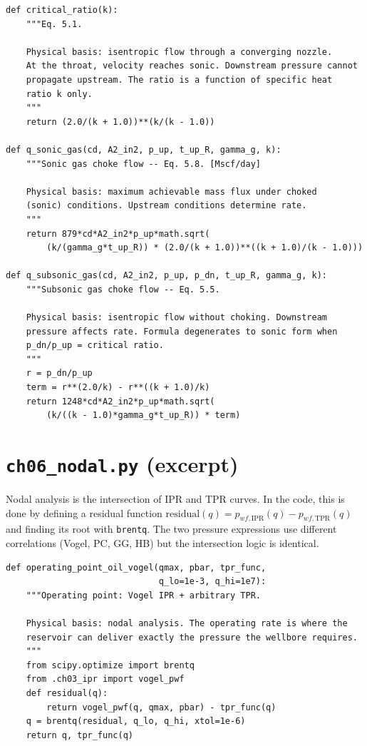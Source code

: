 \documentclass[11pt,a4paper,openany]{book}
\newcommand{\code}[1]{\texttt{#1}}
\begin{document}
\begin{lstlisting}
def critical_ratio(k):
    """Eq. 5.1.

    Physical basis: isentropic flow through a converging nozzle.
    At the throat, velocity reaches sonic. Downstream pressure cannot
    propagate upstream. The ratio is a function of specific heat
    ratio k only.
    """
    return (2.0/(k + 1.0))**(k/(k - 1.0))

def q_sonic_gas(cd, A2_in2, p_up, t_up_R, gamma_g, k):
    """Sonic gas choke flow -- Eq. 5.8. [Mscf/day]

    Physical basis: maximum achievable mass flux under choked
    (sonic) conditions. Upstream conditions determine rate.
    """
    return 879*cd*A2_in2*p_up*math.sqrt(
        (k/(gamma_g*t_up_R)) * (2.0/(k + 1.0))**((k + 1.0)/(k - 1.0)))

def q_subsonic_gas(cd, A2_in2, p_up, p_dn, t_up_R, gamma_g, k):
    """Subsonic gas choke flow -- Eq. 5.5.

    Physical basis: isentropic flow without choking. Downstream
    pressure affects rate. Formula degenerates to sonic form when
    p_dn/p_up = critical ratio.
    """
    r = p_dn/p_up
    term = r**(2.0/k) - r**((k + 1.0)/k)
    return 1248*cd*A2_in2*p_up*math.sqrt(
        (k/((k - 1.0)*gamma_g*t_up_R)) * term)
\end{lstlisting}

\section{\code{ch06\_nodal.py} (excerpt)}

\begin{theory}
Nodal analysis is the intersection of IPR and TPR curves. In the
code, this is done by defining a residual function
$\text{residual}(q) = p_{wf,\text{IPR}}(q) - p_{wf,\text{TPR}}(q)$ and
finding its root with \code{brentq}. The two pressure expressions use
different correlations (Vogel, PC, GG, HB) but the intersection logic
is identical.
\end{theory}

\begin{lstlisting}
def operating_point_oil_vogel(qmax, pbar, tpr_func,
                              q_lo=1e-3, q_hi=1e7):
    """Operating point: Vogel IPR + arbitrary TPR.

    Physical basis: nodal analysis. The operating rate is where the
    reservoir can deliver exactly the pressure the wellbore requires.
    """
    from scipy.optimize import brentq
    from .ch03_ipr import vogel_pwf
    def residual(q):
        return vogel_pwf(q, qmax, pbar) - tpr_func(q)
    q = brentq(residual, q_lo, q_hi, xtol=1e-6)
    return q, tpr_func(q)
\end{lstlisting}
\end{document}
